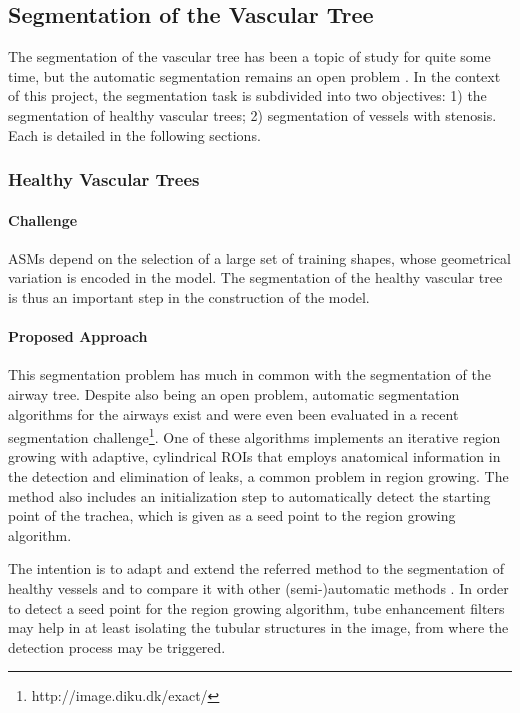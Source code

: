 \documentclass[a4paper]{article}
\newcommand{\challenge}{\paragraph{Challenge}}
\newcommand{\approach}{\paragraph{Proposed Approach}}
\newcommand{\citep}{\cite}
\begin{document}
\subsection{Segmentation of the Vascular Tree}

The segmentation of the vascular tree has been a topic of study for quite some time, but the automatic segmentation remains an open problem \citep{ORKI-08}. In the context of this project, the segmentation task is subdivided into two objectives: 1) the segmentation of healthy vascular trees; 2) segmentation of vessels with stenosis. Each is detailed in the following sections.

\subsubsection{Healthy Vascular Trees}

\challenge

ASMs depend on the selection of a large set of training shapes, whose geometrical variation is encoded in the model. The segmentation of the healthy vascular tree is thus an important step in the construction of the model. 

\approach

This segmentation problem has much in common with the segmentation of the airway tree. Despite also being an open problem, automatic segmentation algorithms for the airways exist and were even been evaluated in a recent segmentation challenge\footnote{http://image.diku.dk/exact/}. One of these algorithms \citep{Pinho:Airways2} implements an iterative region growing with adaptive, cylindrical ROIs that employs anatomical information in the detection and elimination of leaks, a common problem in region growing. The method also includes an initialization step to automatically detect the starting point of the trachea, which is given as a seed point to the region growing algorithm. 


The intention is to adapt and extend the referred method to the segmentation of healthy vessels and to compare it with other (semi-)automatic methods \citep{Zhou20121,CARR-07,FLOR-07b,Florez2,Scherl200721,Antiga,Bemmel}. In order to detect a seed point for the region growing algorithm, tube enhancement filters \citep{ORLO-09} may help in at least isolating the tubular structures in the image, from where the detection process may be triggered. 
\end{document}
